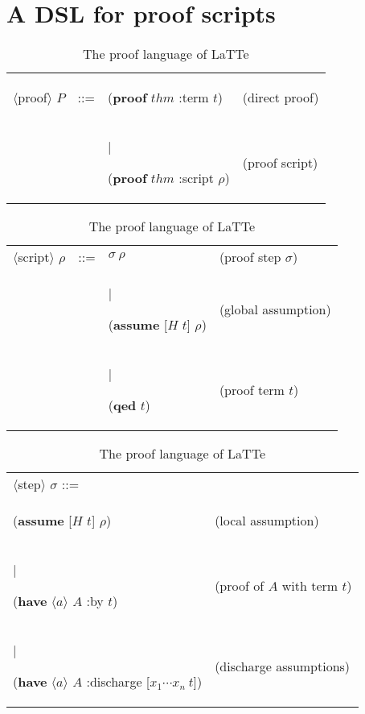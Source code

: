 \documentclass{styles/sig-alternate-05-2015}
\newcommand{\kw}[1]{\textbf{#1}}
\newcommand{\code}[1]{\begin{sffamily}{\small #1}\end{sffamily}}
\begin{document}
\section{A DSL for proof scripts}
  \label{sec:proofscripts}

\begin{table}
\begin{tabular}{llll}
  $\langle$proof$\rangle$ $P$ & ::= & \code{(\kw{proof} $thm$ :term $t$)} & (direct proof) \\
  & & | \code{(\kw{proof} $thm$ :script $\rho$)} & (proof script) \\[16pt]
\end{tabular}
\begin{tabular}{llll}
  $\langle$script$\rangle$ $\rho$ & ::= & $\sigma~\rho$ & (proof step $\sigma$) \\
  & & | \code{(\kw{assume} [$H$ $t$] $\rho$)} & (global assumption) \\
  & & | \code{(\kw{qed} $t$)} & (proof term $t$) \\[16pt]
\end{tabular}
\begin{tabular}{ll}
  $\langle$step$\rangle$ $\sigma$ ::= \\
  \phantom{|} \code{(\kw{assume} [$H$ $t$] $\rho$)} & (local assumption) \\
  | \code{(\kw{have} $\langle a \rangle$ $A$ :by $t$)} & (proof of $A$ with term $t$) \\
  | \code{(\kw{have} $\langle a \rangle$ $A$ :discharge [$x_1 \cdots x_n~t$])} & (discharge assumptions) \\
\end{tabular}
\caption{\label{tab:proof:syntax}The proof language of LaTTe}
\end{table}
\end{document}
